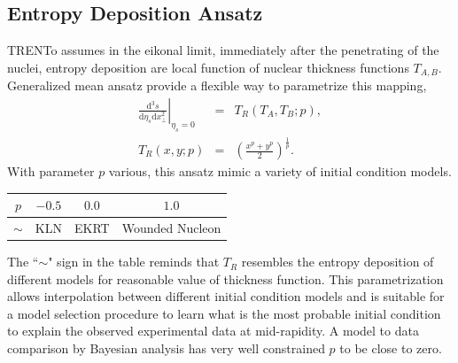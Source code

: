 \documentclass[10pt,a4paper, twocolumn]{article}
\begin{document}
	\subsection{Entropy Deposition Ansatz}
	TRENTo assumes in the eikonal limit, immediately after the penetrating of the nuclei, entropy deposition are local function of nuclear thickness functions $T_{A,B}$. 
	Generalized mean ansatz provide a flexible way to parametrize this mapping,
	\begin{eqnarray}
	\left.\frac{\mathrm{d^3}s}{\mathrm{d}\eta_s \mathrm{d}x_\perp^2}\right\vert_{\eta_s = 0} &=& 	T_R\left(T_A, T_B; p\right),	\\
	T_R(x, y; p) &=& \left(\frac{x^p+y^p}{2}\right)^{\frac{1}{p}}.
	\end{eqnarray}
	With parameter $p$ various, this ansatz mimic a variety of initial condition models.
	\begin{center}
	\begin{tabular}{c|c|c|c}
	\hline
	$p$	&	$-0.5$	 	&	$0.0$ 		& 	$1.0$		\\
	\hline	
	$\sim$ &		KLN		& 	EKRT		& 		Wounded Nucleon \\
	\hline
	\end{tabular}
	\end{center}
	The ``$\sim$" sign in the table reminds that $T_R$ resembles the entropy deposition of different models for reasonable value of thickness function. 
	This parametrization allows interpolation between different initial condition models and is suitable for a model selection procedure to learn what is the most probable initial condition to explain the observed experimental data at mid-rapidity.
	A model to data comparison by Bayesian analysis has very well constrained $p$ to be close to zero.
\end{document}
